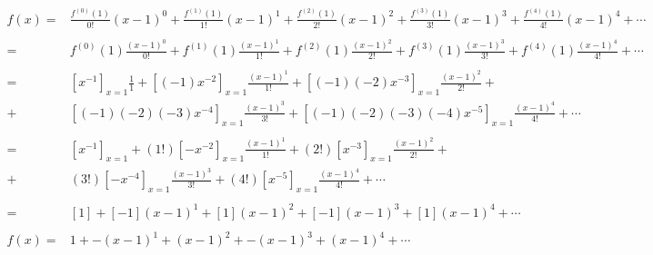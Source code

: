 \documentclass[11pt]{homework}
\begin{document}
    \begin{align*}
        f(x)
        = & \frac{f^{(0)}(1)}{0!}(x-1)^0 + \frac{f^{(1)}(1)}{1!}(x-1)^1 + \frac{f^{(2)}(1)}{2!}(x-1)^2 + \frac{f^{(3)}(1)}{3!}(x-1)^3 + \frac{f^{(4)}(1)}{4!}(x-1)^4 + \cdots \\
        \\
        = & f^{(0)}(1)\frac{(x-1)^0}{0!} + f^{(1)}(1)\frac{(x-1)^1}{1!} + f^{(2)}(1)\frac{(x-1)^2}{2!} + f^{(3)}(1)\frac{(x-1)^3}{3!} + f^{(4)}(1)\frac{(x-1)^4}{4!} + \cdots \\
        \\
        = & [x^{-1}]_{x=1}\frac{1}{1} + [(-1)x^{-2}]_{x=1}\frac{(x-1)^1}{1!} + [(-1)(-2)x^{-3}]_{x=1}\frac{(x-1)^2}{2!} + \\ + & [(-1)(-2)(-3)x^{-4}]_{x=1}\frac{(x-1)^3}{3!} + [(-1)(-2)(-3)(-4)x^{-5}]_{x=1}\frac{(x-1)^4}{4!} + \cdots \\
        \\
        = & [x^{-1}]_{x=1} + (1!)[-x^{-2}]_{x=1}\frac{(x-1)^1}{1!} + (2!)[x^{-3}]_{x=1}\frac{(x-1)^2}{2!} + \\ + & (3!)[-x^{-4}]_{x=1}\frac{(x-1)^3}{3!} + (4!)[x^{-5}]_{x=1}\frac{(x-1)^4}{4!} + \cdots \\
        \\
        = & [1] + [-1](x-1)^1 + [1](x-1)^2 + [-1](x-1)^3 + [1](x-1)^4 + \cdots \\
        \\
        f(x)
        = & 1 + -(x-1)^1 + (x-1)^2 + -(x-1)^3 + (x-1)^4 + \cdots \\
        \\
    \end{align*}

    
    
    
    
\end{document}
